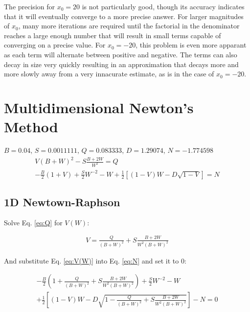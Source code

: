 \documentclass[12pt]{article}
\begin{document}
  
  
  The precision for $x_0=20$ is not particularly good, though  its accuracy
  indicates that it will eventually converge to a more precise answer. For larger
  magnitudes of $x_0$, many more iterations are required until the factorial
  in the denominator reaches a large enough number that will result in small
  terms capable of converging on a precise value.
  For $x_0=-20$, this problem is even more apparant as each term will alternate
  between positive and negative. The terms can also decay in size very quickly
  resulting in an approximation that decays more and more slowly away from a
  very innacurate estimate, as is in the case of $x_0=-20$.

  

  \clearpage

  \section{Multidimensional Newton's Method}
   \center $B=0.04$, $S=0.0011111$, $Q=0.083333$, $D=1.29074$, $N=-1.774598$\\
  \begin{align}
    \label{eq:Q}
    V(B+W)^2 - S\frac{B+2W}{W^2}=Q \\
    \label{eq:N}
    -\frac{B}{2}(1+V)+\frac{S}{2}W^{-2}-W+\frac{1}{2}\left[(1-V)W-D\sqrt{1-V}\right]=N
  \end{align}

  \subsection*{1D Newtown-Raphson}

  Solve  Eq. \ref{eq:Q} for $V(W)$:

  \begin{align}
    \label{eq:V(W)}
    V = \frac{Q}{(B+W)^2} + S\frac{B+2W}{W^2(B+W)^2}
  \end{align}

  And substitute Eq. \ref{eq:V(W)} into Eq. \ref{eq:N} and set it to 0:
  
  \begin{align}
    \label{eq:long}
    -\frac{B}{2}(1+\frac{Q}{(B+W)^2} + S\frac{B+2W}{W^2(B+W)^2})+\frac{S}{2}W^{-2}-W\nonumber\\
+\frac{1}{2}\left[(1-V)W - D\sqrt{1-\frac{Q}{(B+W)^2} + S\frac{B+2W}{W^2(B+W)^2}}\right]-N=0
  \end{align}
\end{document}

